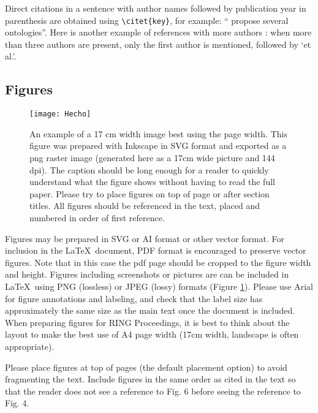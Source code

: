 \documentclass[final]{ring}
\begin{document}
Direct citations in a sentence with author names followed by publication year in parenthesis are obtained using \verb|\citet{key}|, for example: ``\citet{Perrin2013} propose several ontologies''. 
Here is another example of references with more authors \citep{Collon2017G, Freeman1990FB, Kolditz2012EES}: when more than three authors are present, only the first author is mentioned, followed by `et al.'. 

\subsection{Figures}
\begin{figure}
\centering\texttt{[image: Hecho]}
\caption{An example of a 17 cm width image best using the page width. This figure was prepared with Inkscape in SVG format and exported as a png raster image (generated here as a 17cm wide picture and 144 dpi). The caption should be long enough for a reader to quickly understand what the figure shows without having to read the full paper. Please try to place figures on top of page or after section titles. All figures should be referenced in the text, placed and numbered in order of first reference.}
\label{fig:example}
\end{figure}

Figures may be prepared in SVG or AI format or other vector format. For inclusion in the \LaTeX\ document, PDF format is encouraged to preserve vector figures. Note that in this case the pdf page should be cropped to the figure width and height. Figures including screenshots or pictures are can be included in \LaTeX\ using PNG (lossless) or JPEG (lossy) formats (Figure \ref{fig:example}). Please use Arial for figure annotations and labeling, and check that the label size has approximately the same size as the main text once the document is included. When preparing figures for RING Proceedings, it is best to think about the layout to make the best use of A4 page width (17cm width, landscape is often appropriate). 

Please place figures at top of pages (the default placement option) to avoid fragmenting the text. Include figures in the same order as cited in the text so that the reader does not see a reference to Fig. 6 before seeing the reference to Fig. 4. 
\end{document}
